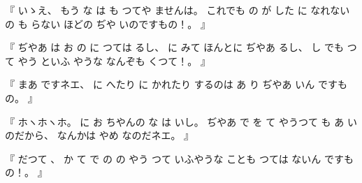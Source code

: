 %
『
いゝえ、
%
もう
な
は
も
つてや
ませんは。
%
これでも
の
が
した
に
なれない
の
も
らない
ほどの
ぢや
いのですもの！。
』

%
『
ぢやあ
は
お
の
に
つては
るし、
%
に
みて
ほんとに
ぢやあ
るし、
%
し
でも
つて
やう
といふ
やうな
なんぞも
くつて！。
』

%
『
まあ
ですネエ、
%
に
へたり
に
かれたり
するのは
あ
り
ぢやあ
いん
ですもの。
』

%
『
ホヽホヽホ。
%
に
お
ちやんの
な
は
いし。
%
ぢやあ
で
を
て
やうつて
も
あ
い
のだから、
%
なんかは
やめ
なのだネエ。
』

%
『
だつて
、
%
か
て
で
の
の
やう
つて
いふやうな
ことも
つては
ないん
ですもの！。
』
